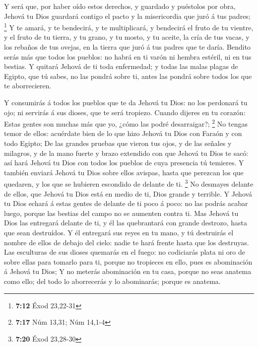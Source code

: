  Y será que, por haber oído estos derechos, y guardado y
puéstolos por obra, Jehová tu Dios guardará contigo el pacto y la
misericordia que juró á tus padres; \footnote{\textbf{7:12} Éxod
  23,22-31}  Y te amará, y te bendecirá, y te
multiplicará, y bendecirá el fruto de tu vientre, y el fruto de tu
tierra, y tu grano, y tu mosto, y tu aceite, la cría de tus vacas, y los
rebaños de tus ovejas, en la tierra que juró á tus padres que te daría.
 Bendito serás más que todos los pueblos: no habrá en ti
varón ni hembra estéril, ni en tus bestias.  Y quitará
Jehová de ti toda enfermedad; y todas las malas plagas de Egipto, que tú
sabes, no las pondrá sobre ti, antes las pondrá sobre todos los que te
aborrecieren.

 Y consumirás á todos los pueblos que te da Jehová tu
Dios: no los perdonará tu ojo; ni servirás á sus dioses, que te será
tropiezo.  Cuando dijeres en tu corazón: Estas gentes son
muchas más que yo, ¿cómo las podré desarraigar?; \footnote{\textbf{7:17}
  Núm 13,31; Núm 14,1-4}  No tengas temor de ellos:
acuérdate bien de lo que hizo Jehová tu Dios con Faraón y con todo
Egipto;  De las grandes pruebas que vieron tus ojos, y de
las señales y milagros, y de la mano fuerte y brazo extendido con que
Jehová tu Dios te sacó: así hará Jehová tu Dios con todos los pueblos de
cuya presencia tú temieres.  Y también enviará Jehová tu
Dios sobre ellos avispas, hasta que perezcan los que quedaren, y los que
se hubieren escondido de delante de ti. \footnote{\textbf{7:20} Éxod
  23,28-30}  No desmayes delante de ellos, que Jehová tu
Dios está en medio de ti, Dios grande y terrible.  Y
Jehová tu Dios echará á estas gentes de delante de ti poco á poco: no
las podrás acabar luego, porque las bestias del campo no se aumenten
contra ti.  Mas Jehová tu Dios las entregará delante de
ti, y él las quebrantará con grande destrozo, hasta que sean destruídos.
 Y él entregará sus reyes en tu mano, y tú destruirás el
nombre de ellos de debajo del cielo: nadie te hará frente hasta que los
destruyas.  Las esculturas de sus dioses quemarás en el
fuego: no codiciarás plata ni oro de sobre ellas para tomarlo para ti,
porque no tropieces en ello, pues es abominación á Jehová tu Dios;
 Y no meterás abominación en tu casa, porque no seas
anatema como ello; del todo lo aborrecerás y lo abominarás; porque es
anatema.

